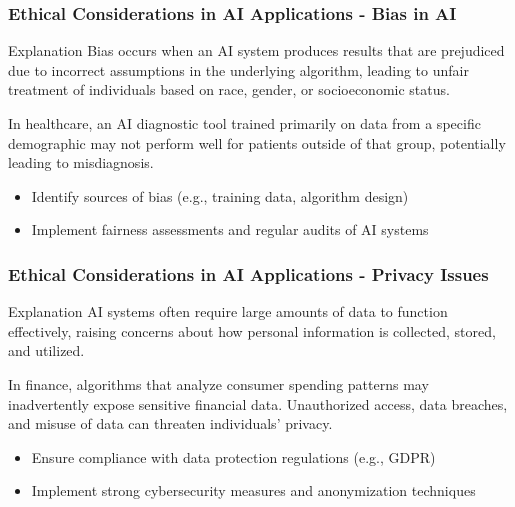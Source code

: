 \documentclass{beamer}
\begin{document}
\begin{frame}[fragile]
    \frametitle{Ethical Considerations in AI Applications - Bias in AI}
    \begin{block}{Explanation}
        Bias occurs when an AI system produces results that are prejudiced due to incorrect assumptions in the underlying algorithm, leading to unfair treatment of individuals based on race, gender, or socioeconomic status.
    \end{block}
    \begin{example}
        In healthcare, an AI diagnostic tool trained primarily on data from a specific demographic may not perform well for patients outside of that group, potentially leading to misdiagnosis.
    \end{example}
    
    \begin{itemize}
        \item Identify sources of bias (e.g., training data, algorithm design)
        \item Implement fairness assessments and regular audits of AI systems
    \end{itemize}
\end{frame}

\begin{frame}[fragile]
    \frametitle{Ethical Considerations in AI Applications - Privacy Issues}
    \begin{block}{Explanation}
        AI systems often require large amounts of data to function effectively, raising concerns about how personal information is collected, stored, and utilized.
    \end{block}
    \begin{example}
        In finance, algorithms that analyze consumer spending patterns may inadvertently expose sensitive financial data. Unauthorized access, data breaches, and misuse of data can threaten individuals' privacy.
    \end{example}
    
    \begin{itemize}
        \item Ensure compliance with data protection regulations (e.g., GDPR)
        \item Implement strong cybersecurity measures and anonymization techniques
    \end{itemize}
\end{frame}
\end{document}
